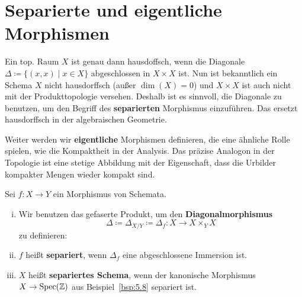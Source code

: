 

\chapter{Separierte und eigentliche Morphismen}
\label{chap:10}
Ein top. Raum $X$ ist genau dann hausdoffsch, wenn die Diagonale $\Delta \coloneqq \{(x,x) \mid x \in X\}$ abgeschlossen in $X \times X$ ist. Nun ist bekanntlich ein Schema $X$ nicht hausdorffsch (außer $\dim(X) = 0$) und $X\times X$ ist auch nicht mit der Produkttopologie versehen. Deshalb ist es sinnvoll, die Diagonale zu benutzen, um den Begriff des \textbf{separierten} Morphismus einzuführen. Das ersetzt hausdorffsch in der algebraischen Geometrie.

Weiter werden wir \textbf{eigentliche} Morphismen definieren, die eine ähnliche Rolle spielen, wie die Kompaktheit in der Analysis. Das präzise Analogon in der Topologie ist eine stetige Abbildung mit der Eigenschaft, dass die Urbilder kompakter Mengen wieder kompakt sind.

\begin{defn}
\label{defn:10.1} Sei $f \colon X \to Y$ ein Morphismus von Schemata.
	\begin{enumerate}[i)]
		\item\label{defn:10.1:i} Wir benutzen das gefaserte Produkt, um den \textbf{Diagonalmorphismus}
		\[
			\Delta\coloneqq \Delta_{X/Y} \coloneqq \Delta_f \colon X \to X \times_Y X
		\]
		zu definieren:
		\begin{center}
		\end{center}
		\item\label{defn:10.1:ii} $f$ heißt \textbf{separiert}, wenn $\Delta_f$ eine abgeschlossene Immersion ist.
		\item\label{defn:10.1:iii} $X$ heißt \textbf{separiertes Schema}, wenn der kanonische Morphismus $X \to \operatorname{Spec}(\mathbb {Z})$ aus Beispiel~\ref{bsp:5.8} separiert ist.
	\end{enumerate}
\end{defn}

